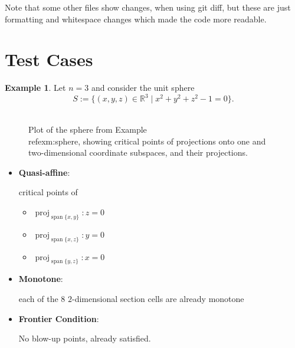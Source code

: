 \documentclass[
]{book}
\providecommand{\tightlist}{%
  \setlength{\itemsep}{0pt}\setlength{\parskip}{0pt}}
\theoremstyle{definition}
\theoremstyle{definition}
\newtheorem{example}{Example}[chapter]
\theoremstyle{definition}
\theoremstyle{definition}
\theoremstyle{remark}
\begin{document}
Note that some other files show changes, when using git diff, but these are just formatting and whitespace changes which made the code more readable.

\hypertarget{test-cases-1}{%
\section{Test Cases}\label{test-cases-1}}

\begin{example}
\protect\hypertarget{exm:sphere}{}\label{exm:sphere}Let \(n = 3\) and consider the unit sphere
\[
S := \{ (x,y,z) \in \mathbb{R}^3 \mid x^2 + y^2 + z^2 - 1 = 0 \}.
\]
\end{example}

\begin{figure}

{\centering \includegraphics[width=0.6\linewidth]{gnuplot/sphere} 

}

\caption{Plot of the sphere from Example \\ref{exm:sphere}, showing critical points of projections onto one and two-dimensional coordinate subspaces, and their projections.}\label{fig:unnamed-chunk-4}
\end{figure}

\begin{itemize}
\item
  \textbf{Quasi-affine}:

  critical points of

  \begin{itemize}
  \tightlist
  \item
    \({\operatorname{proj}_{{\operatorname{span} \{x,y\}}}}: z = 0\)
  \item
    \({\operatorname{proj}_{{\operatorname{span} \{x,z\}}}}: y = 0\)
  \item
    \({\operatorname{proj}_{{\operatorname{span} \{y,z\}}}}: x = 0\)
  \end{itemize}
\item
  \textbf{Monotone}:

  each of the 8 \(2\)-dimensional section cells are already monotone
\item
  \textbf{Frontier Condition}:

  No blow-up points, already satisfied.
\end{itemize}
\end{document}
